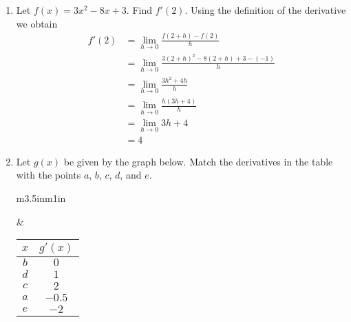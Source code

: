 \documentclass[11pt]{article}
\begin{document}
\drawtitle

\begin{enumerate}
\item Let $f(x) = 3x^2-8x+3$.  Find $f'(2)$.
  \vfill
  {\color{blue}
    Using the definition of the derivative we obtain
    \begin{align*}
      f'(2) &= \lim_{h\to 0} \frac{f(2+h)-f(2)}{h}\\
      &= \lim_{h\to 0} \frac{3(2+h)^2-8(2+h)+3 - (-1)}{h}\\
      &= \lim_{h\to 0} \frac{3h^2+4h}{h}\\
      &= \lim_{h\to 0} \frac{h(3h+4)}{h}\\
      &= \lim_{h\to 0} 3h+4\\
      &= 4
    \end{align*}
  }
  \vfill
\item Let $g(x)$ be given by the graph below.  Match the derivatives
  in the table with the points $a$, $b$, $c$, $d$, and $e$.

  \begin{center}
    \begin{tabular}{m{3.5in}m{1in}}
      \begin{tikzpicture}[scale = 1.5]
        \draw[<->] (-1,0) -- (3.75,0);
        \draw[<->] (0,-2) -- (0,3);
        \draw[-] (.27,.1) -- (.27,-.1) node[below] {$a$};
        \draw[-] (.45,.1) -- (.45,-.1) node[below] {$b$};
        \draw[-] (2,.1) -- (2,-.1) node[below] {$d$};
        \draw[-] (2.5,.1) -- (2.5,-.1) node[below] {$e$};
        \draw[-] (1,.1) -- (1,-.1) node[below] {$c$};
        
        \draw[thick, domain=-.5:3.25, <->] plot[samples=200]
        function{-x*(x-1)*(x-3)} node[right]{$g(x)$};
      \end{tikzpicture}
      &
      \begin{tabular}{c|c}
        $x$ & $g'(x)$\\
        \hline
        {\color{blue} $b$}&$0$\\
        {\color{blue} $d$}&$1$\\
        {\color{blue} $c$}&$2$\\
        {\color{blue} $a$}&$-0.5$\\
        {\color{blue} $e$}&$-2$
      \end{tabular}
    \end{tabular}
  \end{center}

  \newpage


\end{enumerate}
\end{document}
